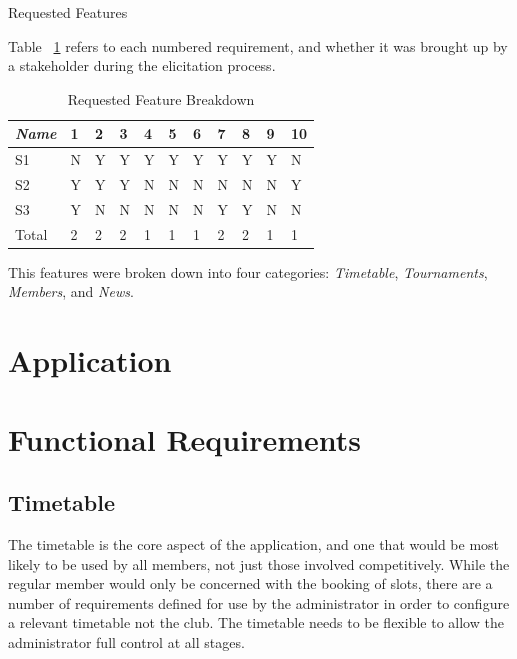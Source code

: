 \begin{table}[H]
\label{fig:requirementsFeatures}
\caption{Requested Features}
\end{table}
Table ~\ref{fig:reqbreakdown} refers to each numbered requirement, and whether it was brought up by a stakeholder during the elicitation process.
\begin{table}[H]
\caption{Requested Feature Breakdown}
\begin{center}
    \begin{tabular}{ | l | l | l | l| l| l| l| l| l|l| p{.22cm} |}
    \hline
     \textit{Name}& 1& 2 & 3 & 4 & 5 & 6 & 7 & 8 & 9 & 10\\ \hline
	 S1 & N & Y & Y & Y & Y & Y & Y & Y & Y & N\\ \hline
	 S2 & Y & Y & Y & N & N & N & N & N & N & Y\\ \hline
	 S3 & Y & N & N & N & N & N & Y & Y & N & N\\ \hline
  Total & 2 & 2 & 2 & 1 & 1 & 1 & 2 & 2 & 1 & 1\\ \hline
    \end{tabular}
\end{center}
\label{fig:reqbreakdown}
\end{table}

This features were broken down into four categories: \textit{Timetable}, \textit{Tournaments}, \textit{Members}, and \textit{News}.

\section{Application}

\section{Functional Requirements}



\subsection{Timetable} 

The timetable is the core aspect of the application, and one that would be most likely to be used by all members, not just those involved competitively. While the regular member would only be concerned with the booking of slots, there are a number of requirements defined for use by the administrator in order to configure a relevant timetable not the club. The timetable needs to be flexible to allow the administrator full control at all stages.

